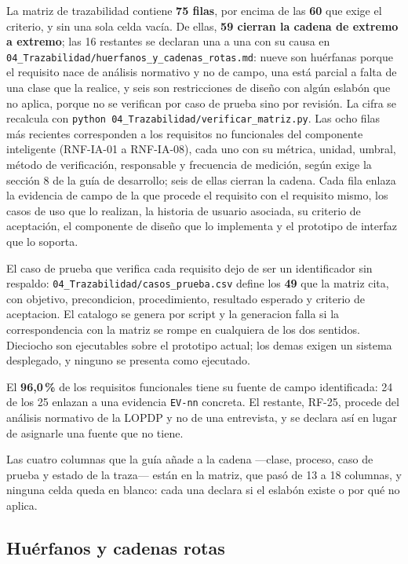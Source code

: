 \documentclass[11pt,a4paper]{article}
\begin{document}
La matriz de trazabilidad contiene \textbf{75 filas}, por encima de las
\textbf{60} que exige el criterio, y sin una sola celda vac\'ia. De ellas,
\textbf{59 cierran la cadena de extremo a extremo}; las 16 restantes se declaran una
a una con su causa en \texttt{04\_Trazabilidad/huerfanos\_y\_cadenas\_rotas.md}:
nueve son hu\'erfanas porque el requisito nace de an\'alisis normativo y no de campo,
una est\'a parcial a falta de una clase que la realice, y seis son
restricciones de dise\~no con alg\'un eslab\'on que no aplica, porque no se verifican por
caso de prueba sino por revisi\'on. La cifra se recalcula con
\texttt{python 04\_Trazabilidad/verificar\_matriz.py}.
Las ocho filas m\'as recientes corresponden a los requisitos no funcionales del
componente inteligente (RNF-IA-01 a RNF-IA-08), cada uno con su m\'etrica, unidad,
umbral, m\'etodo de verificaci\'on, responsable y frecuencia de medici\'on, seg\'un
exige la secci\'on 8 de la gu\'ia de desarrollo; seis de ellas cierran la cadena. Cada fila enlaza la evidencia de campo de la que procede el requisito
con el requisito mismo, los casos de uso que lo realizan, la historia de usuario
asociada, su criterio de aceptaci\'on, el componente de dise\~no que lo implementa y
el prototipo de interfaz que lo soporta.

El caso de prueba que verifica cada requisito dejo de ser un identificador sin
respaldo: \texttt{04\_Trazabilidad/casos\_prueba.csv} define los \textbf{49}
que la matriz cita, con objetivo, precondicion, procedimiento, resultado
esperado y criterio de aceptacion. El catalogo se genera por script y la
generacion falla si la correspondencia con la matriz se rompe en cualquiera de
los dos sentidos. Dieciocho son ejecutables sobre el prototipo actual; los
demas exigen un sistema desplegado, y ninguno se presenta como ejecutado.

El \textbf{96,0\,\%} de los requisitos funcionales tiene su fuente de campo
identificada: 24 de los 25 enlazan a una evidencia \texttt{EV-nn} concreta. El restante,
RF-25, procede del an\'alisis normativo de la LOPDP y no de una entrevista, y se declara
as\'i en lugar de asignarle una fuente que no tiene.

Las cuatro columnas que la gu\'ia a\~nade a la cadena ---clase, proceso, caso de prueba y
estado de la traza--- est\'an en la matriz, que pas\'o de 13 a 18 columnas, y ninguna celda
queda en blanco: cada una declara si el eslab\'on existe o por qu\'e no aplica.

\subsection{Hu\'erfanos y cadenas rotas}
\end{document}

